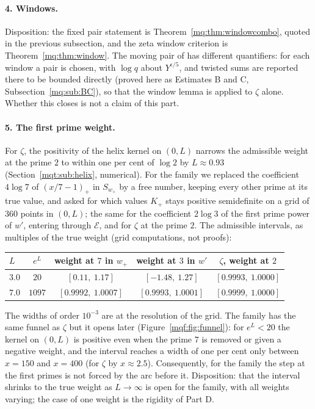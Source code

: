 \paragraph{4. Windows.} Disposition: the fixed pair statement is Theorem~\ref{mq:thm:windowcombo}, quoted in the previous subsection, and the zeta window criterion is Theorem~\ref{mq:thm:window}. The moving pair of \cite{Rub26} has different quantifiers: for each window a pair is chosen, with $\log q$ about $Y^{\epsilon/5}$, and twisted sums are reported there to be bounded directly (proved here as Estimates B and C, Subsection~\ref{mq:sub:BC}), so that the window lemma is applied to $\zeta$ alone. Whether this closes is not a claim of this part.

\paragraph{5. The first prime weight.} For $\zeta$, the positivity of the helix kernel on $(0,L)$ narrows the admissible weight at the prime $2$ to within one per cent of $\log2$ by $L\approx0.93$ (Section~\ref{mqt:sub:helix}, numerical). For the family we replaced the coefficient $4\log7$ of $(x/7-1)_+$ in $S_{w_+}$ by a free number, keeping every other prime at its true value, and asked for which values $K_+$ stays positive semidefinite on a grid of $360$ points in $(0,L)$; the same for the coefficient $2\log3$ of the first prime power of $w'$, entering through $\mathcal E$, and for $\zeta$ at the prime $2$. The admissible intervals, as multiples of the true weight (grid computations, not proofs):
\begin{center}
\small
\begin{tabular}{lcccc}
\hline
$L$ & $e^L$ & weight at $7$ in $w_+$ & weight at $3$ in $w'$ & $\zeta$, weight at $2$\\
\hline

$3.0$ & $20$ & $[0.11,\ 1.17]$ & $[-1.48,\ 1.27]$ & $[0.9993,\ 1.0000]$\\

$7.0$ & $1097$ & $[0.9992,\ 1.0007]$ & $[0.9993,\ 1.0001]$ & $[0.9999,\ 1.0000]$\\
\hline
\end{tabular}
\end{center}
The widths of order $10^{-3}$ are at the resolution of the grid. The family has the same funnel as $\zeta$ but it opens later (Figure~\ref{mqf:fig:funnel}): for $e^L<20$ the kernel on $(0,L)$ is positive even when the prime $7$ is removed or given a negative weight, and the interval reaches a width of one per cent only between $x=150$ and $x=400$ (for $\zeta$ by $x\approx2.5$). Consequently, for the family the step at the first primes is not forced by the arc before it. Disposition: that the interval shrinks to the true weight as $L\to\infty$ is open for the family, with all weights varying; the case of one weight is the rigidity of Part D.

